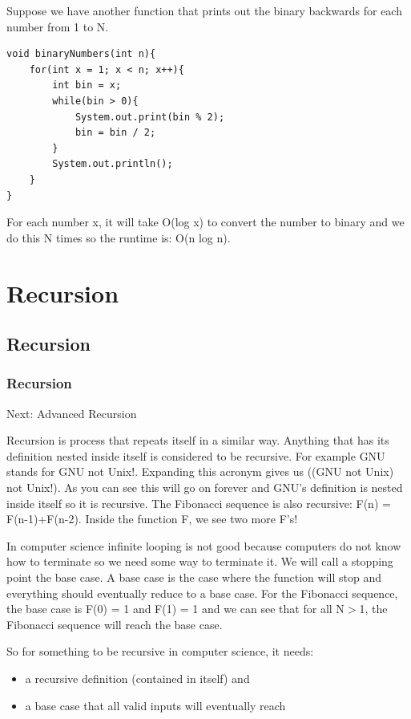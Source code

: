 \documentclass[11pt,oneside]{book}
\begin{document}
Suppose we have another function that prints out the binary backwards for each number from 1 to N.

\begin{lstlisting}
void binaryNumbers(int n){
    for(int x = 1; x < n; x++){
        int bin = x;
        while(bin > 0){
            System.out.print(bin % 2);
            bin = bin / 2;
        }
        System.out.println();
    }
}
\end{lstlisting}

For each number x, it will take O(log x) to convert the number to binary and we do this N times so the runtime is: O(n log n).

\part{ Recursion }
    \chapter{ Recursion }
        \section{ Recursion }
        

Next: Advanced Recursion

Recursion is process that repeats itself in a similar way. Anything that has its definition nested inside itself is considered to be recursive. For example GNU stands for GNU not Unix!. Expanding this acronym gives us ((GNU not Unix) not Unix!). As you can see this will go on forever and GNU's definition is nested inside itself so it is recursive. The Fibonacci sequence is also recursive: F(n) = F(n-1)+F(n-2). Inside the function F, we see two more F's!

In computer science infinite looping is not good because computers do not know how to terminate so we need some way to terminate it. We will call a stopping point the base case. A base case is the case where the function will stop and everything should eventually reduce to a base case. For the Fibonacci sequence, the base case is F(0) = 1 and F(1) = 1 and we can see that for all N$>$1, the Fibonacci sequence will reach the base case.

So for something to be recursive in computer science, it needs:

\begin{itemize}
\item a recursive definition (contained in itself) and 
\item a base case that all valid inputs will eventually reach
\end{itemize}
\end{document}
